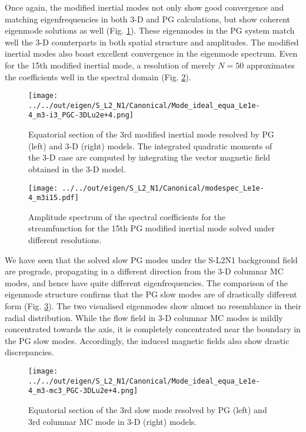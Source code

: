 Once again, the modified inertial modes not only show good convergence and matching eigenfrequencies in both 3-D and PG calculations, but show coherent eigenmode solutions as well (Fig. \ref{fig:SL2N1-eq-m3i3}). These eigenmodes in the PG system match well the 3-D counterparts in both spatial structure and amplitudes. The modified inertial modes also boast excellent convergence in the eigenmode spectrum. Even for the 15th modified inertial mode, a resolution of merely $N=50$ approximates the coefficients well in the spectral domain (Fig. \ref{fig:SL2N1-modespec-m3i15}).
\begin{figure}[htbp]
    \centering
    \texttt{[image: ../../out/eigen/S\_L2\_N1/Canonical/Mode\_ideal\_equa\_Le1e-4\_m3-i3\_PGC-3DLu2e+4.png]}
    \caption{Equatorial section of the 3rd modified inertial mode resolved by PG (left) and 3-D (right) models. The integrated quadratic moments of the 3-D case are computed by integrating the vector magnetic field obtained in the 3-D model.}
    \label{fig:SL2N1-eq-m3i3}
\end{figure}
%
\begin{figure}[htbp]
    \centering
    \texttt{[image: ../../out/eigen/S\_L2\_N1/Canonical/modespec\_Le1e-4\_m3i15.pdf]}
    \caption{Amplitude spectrum of the spectral coefficients for the streamfunction for the 15th PG modified inertial mode solved under different resolutions.}
    \label{fig:SL2N1-modespec-m3i15}
\end{figure}

We have seen that the solved slow PG modes under the S-L2N1 background field are prograde, propagating in a different direction from the 3-D columnar MC modes, and hence have quite different eigenfrequencies. The comparison of the eigenmode structure confirms that the PG slow modes are of drastically different form (Fig. \ref{fig:SL2N1-eq-m3mc3}). The two visualised eigenmodes show almost no resemblance in their radial distribution. While the flow field in 3-D columnar MC modes is mildly concentrated towards the axis, it is completely concentrated near the boundary in the PG slow modes. Accordingly, the induced magnetic fields also show drastic discrepancies. 
\begin{figure}[htbp]
    \centering
    \texttt{[image: ../../out/eigen/S\_L2\_N1/Canonical/Mode\_ideal\_equa\_Le1e-4\_m3-mc3\_PGC-3DLu2e+4.png]}
    \caption{Equatorial section of the 3rd slow mode resolved by PG (left) and 3rd columnar MC mode in 3-D (right) models. }
    \label{fig:SL2N1-eq-m3mc3}
\end{figure}

